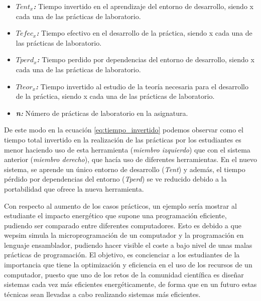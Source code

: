 \begin{itemize}

\item \textbf{\textit{$Tent_{x}$:}} Tiempo invertido en el aprendizaje del entorno de desarrollo, siendo x cada una de las prácticas de laboratorio.

\item \textbf{\textit{$Tefec_{x}$:}} Tiempo efectivo en el desarrollo de la práctica, siendo x cada una de las prácticas de laboratorio.

\item \textbf{\textit{$Tperd_{x}$:}} Tiempo perdido por dependencias del entorno de desarrollo, siendo x cada una de las prácticas de laboratorio.

\item \textbf{\textit{$Tteor_{x}$:}} Tiempo invertido al estudio de la teoría necesaria para el desarrollo de la práctica, siendo x cada una de las prácticas de laboratorio.

\item \textbf{\textit{n:}} Número de prácticas de laboratorio en la asignatura.

\end{itemize}

De este modo en la ecuación \ref{eq:tiempo_invertido} podemos observar como el tiempo total invertido en la realización de las prácticas por los estudiantes es menor haciendo uso de esta herramienta (\emph{miembro izquierdo}) que con el sistema anterior (\emph{miembro derecho}), que hacía uso de diferentes herramientas. En el nuevo sistema, se aprende un único entorno de desarrollo (\emph{Tent}) y además, el tiempo pérdido por dependencias del entorno (\emph{Tperd}) se ve reducido debido a la portabilidad que ofrece la nueva herramienta.

Con respecto al aumento de los casos prácticos, un ejemplo sería mostrar al estudiante el impacto energético que supone una programación eficiente, pudiendo ser comparado entre diferentes computadores. Esto es debido a que \acrshort{wepsim} simula la microprogramación de un computador y la programación en lenguaje \gls{ensamblador}, pudiendo hacer visible el coste a bajo nivel de unas malas prácticas de programación. El objetivo, es concienciar a los estudiantes de la importancia que tiene la optimización y eficiencia en el uso de los recursos de un computador, puesto que uno de los retos de la comunidad científica es diseñar sistemas cada vez más eficientes energéticamente, de forma que en un futuro estas técnicas sean llevadas a cabo realizando sistemas más eficientes.


